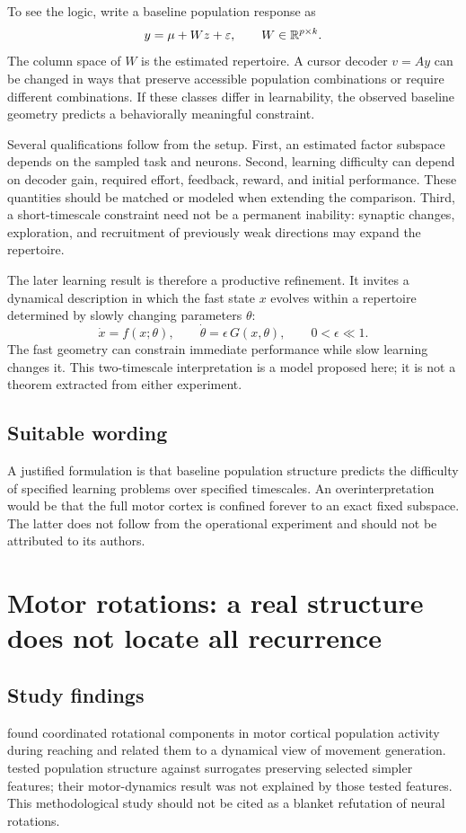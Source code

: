 To see the logic, write a baseline population response as
\[
y=\mu+Wz+\varepsilon,\qquad W\in\mathbb{R}^{p\times k}.
\]
The column space of \(W\) is the estimated repertoire. A cursor decoder \(v=Ay\) can be changed in ways that preserve accessible population combinations or require different combinations. If these classes differ in learnability, the observed baseline geometry predicts a behaviorally meaningful constraint.

Several qualifications follow from the setup. First, an estimated factor subspace depends on the sampled task and neurons. Second, learning difficulty can depend on decoder gain, required effort, feedback, reward, and initial performance. These quantities should be matched or modeled when extending the comparison. Third, a short-timescale constraint need not be a permanent inability: synaptic changes, exploration, and recruitment of previously weak directions may expand the repertoire.

The later learning result is therefore a productive refinement. It invites a dynamical description in which the fast state \(x\) evolves within a repertoire determined by slowly changing parameters \(\theta\):
\[
\dot x=f(x;\theta),\qquad
\dot\theta=\epsilon\,G(x,\theta),\qquad 0<\epsilon\ll1.
\]
The fast geometry can constrain immediate performance while slow learning changes it. This two-timescale interpretation is a model proposed here; it is not a theorem extracted from either experiment.

\subsection{Suitable wording}
A justified formulation is that baseline population structure predicts the difficulty of specified learning problems over specified timescales. An overinterpretation would be that the full motor cortex is confined forever to an exact fixed subspace. The latter does not follow from the operational experiment and should not be attributed to its authors.

\section{Motor rotations: a real structure does not locate all recurrence}
\subsection{Study findings}
\citet{app_churchland2012} found coordinated rotational components in motor cortical population activity during reaching and related them to a dynamical view of movement generation. \citet{ev_elsayed2017} tested population structure against surrogates preserving selected simpler features; their motor-dynamics result was not explained by those tested features. This methodological study should not be cited as a blanket refutation of neural rotations.

